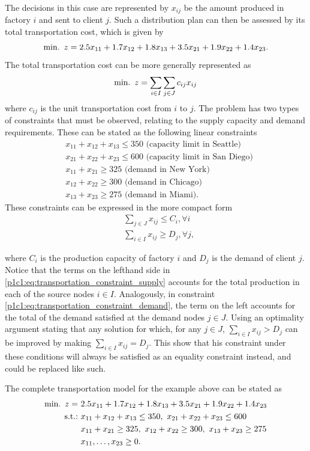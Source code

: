 The decisions in this case are represented by $x_{ij}$ be the amount produced in factory $i$ and sent to client $j$. Such a distribution plan can then be assessed by its total transportation cost, which is given by
%
$$ 
\mathop{\text{min.~}} z = 2.5x_{11} + 1.7x_{12} + 1.8x_{13} + 3.5x_{21} + 1.9x_{22} + 1.4x_{23}.
$$
%
The total transportation cost can be more generally represented as
%
$$
\mathop{\text{min.~}} z = \sum_{i \in I}\sum_{j \in J}c_{ij}x_{ij}
$$
%
where $c_{ij}$ is the unit transportation cost from $i$ to $j$.
%
The problem has two types of constraints that must be observed, relating to the supply capacity and demand requirements. These can be stated as the following linear constraints
%
\begin{align*}
	& x_{11} + x_{12} + x_{13} \leq 350 \text{ (capacity limit in Seattle)}\\
	& x_{21} + x_{22} + x_{23} \leq 600 \text{ (capacity limit in San Diego)}\\
	& x_{11} + x_{21} \geq 325 \text{ (demand in New York)}\\
	& x_{12} + x_{22} \geq 300 \text{ (demand in Chicago)}\\
	& x_{13} + x_{23} \geq 275 \text{ (demand in Miami)}.
\end{align*}
%
These constraints can be expressed in the more compact form
%
\begin{align}
	& \sum_{j \in J} x_{ij} \leq C_i, \forall i  \label{p1c1:eq:transportation_constraint_supply}\\
	& \sum_{i \in I} x_{ij} \geq D_j, \forall j, \label{p1c1:eq:transportation_constraint_demand}
\end{align}

where $C_i$ is the production capacity of factory $i$ and $D_j$ is the demand of client $j$. Notice that the terms on the lefthand side in \eqref{p1c1:eq:transportation_constraint_supply} accounts for the total production in each of the source nodes $i \in I$. Analogously, in constraint \eqref{p1c1:eq:transportation_constraint_demand}, the term on the left accounts for the total of the demand satisfied at the demand nodes $j \in J$. Using an optimality argument stating that any solution for which, for any $j \in J$, $\sum_{i \in I} x_{ij} > D_j$ can be improved by making $\sum_{i \in I} x_{ij} = D_j$. This show that his constraint under these conditions will always be satisfied as an equality constraint instead, and could be replaced like such. 

The complete transportation model for the example above can be stated as 
%
\begin{align*}
	\mini z = \ &2.5x_{11} + 1.7x_{12} + 1.8x_{13} + 3.5x_{21} + 1.9x_{22} + 1.4x_{23} \\
	\st & x_{11} + x_{12} + x_{13} \leq 350, \ 
	x_{21} + x_{22} + x_{23} \leq 600\\
	& x_{11} + x_{21} \geq 325, \ x_{12} + x_{22} \geq 300, \ x_{13} + x_{23} \geq 275\\
	& x_{11}, \dots, x_{23} \geq 0.
\end{align*}
%

